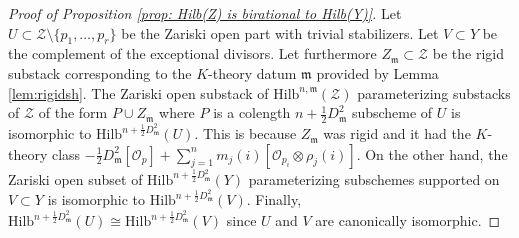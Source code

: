 \documentclass{amsart}
\theoremstyle{definition}
\newcommand{\half}{\frac{1}{2}}
\newcommand{\mdata}{\mathfrak{m}}
\renewcommand{\O}{\mathcal{O}}
\newcommand{\Zcal}{\mathcal{Z}}
\begin{document}
\begin{proof}[Proof of Proposition \ref{prop: Hilb(Z) is birational to Hilb(Y)}]
Let $U\subset \Zcal \setminus \{p_{1},\dotsc ,p_{r} \}$ be
the  Zariski open part with trivial stabilizers. %
Let $V \subset Y$ be the complement of the exceptional divisors.
Let furthermore $Z_{\mdata} \subset \mathcal{Z}$ be the rigid substack corresponding to the $K$-theory datum $\mdata$ provided by Lemma \ref{lem:rigidsh}. 
The Zariski open substack of $\mathrm{Hilb}^{n,\mdata}(\Zcal)$ parameterizing substacks of $\Zcal$ of the form $P \cup Z_{\mdata}$ where $P$ is a colength $n+\half
D_{\mdata}^{2}$ subscheme of $U$ is isomorphic to $\mathrm{Hilb}^{n+\half
D_{\mdata}^{2}}(U)$. This is because  $Z_{\mdata}$ was rigid and it had the $K$-theory class $-\half
D_{\mdata}^{2}[\O_{p}] + \sum_{j=1}^{n}
m_{j}(i)[\O_{p_i}\otimes \rho_{j}(i)]$. On the other hand, the Zariski open subset of $\mathrm{Hilb}^{n+\half
D_{\mdata}^{2}}(Y)$ parameterizing subschemes supported on $V\subset Y$ is isomorphic to $\mathrm{Hilb}^{n+\half
D_{\mdata}^{2}}(V)$. Finally, $\mathrm{Hilb}^{n+\half
D_{\mdata}^{2}}(U)\cong \mathrm{Hilb}^{n+\half
D_{\mdata}^{2}}(V)$ since $U$ and $V$ are canonically isomorphic.
\end{proof}
\end{document}
